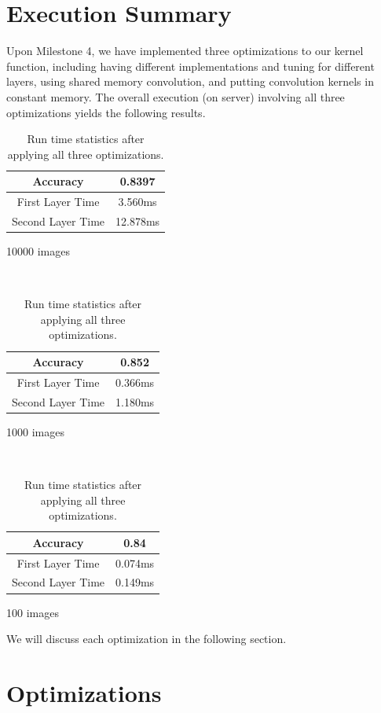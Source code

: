 \documentclass{article}
\begin{document}
\section{Execution Summary}
Upon Milestone 4, we have implemented three optimizations to our kernel function, including having different
implementations and tuning for different layers, using shared memory convolution, and putting convolution
kernels in constant memory. The overall execution (on server) involving all three optimizations yields the following
results.

\begin{table}[H]
    \centering
    \begin{minipage}{.32\linewidth}
        \begin{tabular}{c|c}
            Accuracy & 0.8397 \\ \hline
            First Layer Time & 3.560ms \\ \hline
            Second Layer Time & 12.878ms
        \end{tabular}
        \caption*{10000 images}
    \end{minipage}
    ~
    \begin{minipage}{.32\linewidth}
        \begin{tabular}{c|c}
            Accuracy & 0.852 \\ \hline
            First Layer Time & 0.366ms \\ \hline
            Second Layer Time & 1.180ms
        \end{tabular}
        \caption*{1000 images}
    \end{minipage}
    ~
    \begin{minipage}{.32\linewidth}
        \begin{tabular}{c|c}
            Accuracy & 0.84 \\ \hline
            First Layer Time & 0.074ms \\ \hline
            Second Layer Time & 0.149ms
        \end{tabular}
        \caption*{100 images}
    \end{minipage}
    \caption{Run time statistics after applying all three optimizations.}
\end{table}

We will discuss each optimization in the following section.

\section{Optimizations}
\end{document}
